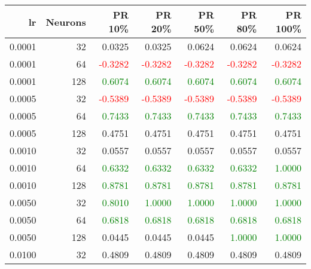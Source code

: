 \begin{tabular}{rrrrrrr}
\toprule
lr & Neurons & PR 10\% & PR 20\% & PR 50\% & PR 80\% & PR 100\% \\
\midrule
0.0001 & 32 & \textcolor{blu} {0.0325} & \textcolor{blu} {0.0325} & \textcolor{blu} {0.0624} & \textcolor{blu} {0.0624} & \textcolor{blu} {0.0624} \\
0.0001 & 64 & \textcolor{red} {-0.3282} & \textcolor{red} {-0.3282} & \textcolor{red} {-0.3282} & \textcolor{red} {-0.3282} & \textcolor{red} {-0.3282} \\
0.0001 & 128 & \textcolor{green} {0.6074} & \textcolor{green} {0.6074} & \textcolor{green} {0.6074} & \textcolor{green} {0.6074} & \textcolor{green} {0.6074} \\
0.0005 & 32 & \textcolor{red} {-0.5389} & \textcolor{red} {-0.5389} & \textcolor{red} {-0.5389} & \textcolor{red} {-0.5389} & \textcolor{red} {-0.5389} \\
0.0005 & 64 & \textcolor{green} {0.7433} & \textcolor{green} {0.7433} & \textcolor{green} {0.7433} & \textcolor{green} {0.7433} & \textcolor{green} {0.7433} \\
0.0005 & 128 & \textcolor{blu} {0.4751} & \textcolor{blu} {0.4751} & \textcolor{blu} {0.4751} & \textcolor{blu} {0.4751} & \textcolor{blu} {0.4751} \\
0.0010 & 32 & \textcolor{blu} {0.0557} & \textcolor{blu} {0.0557} & \textcolor{blu} {0.0557} & \textcolor{blu} {0.0557} & \textcolor{blu} {0.0557} \\
0.0010 & 64 & \textcolor{green} {0.6332} & \textcolor{green} {0.6332} & \textcolor{green} {0.6332} & \textcolor{green} {0.6332} & \textcolor{green} {1.0000} \\
0.0010 & 128 & \textcolor{green} {0.8781} & \textcolor{green} {0.8781} & \textcolor{green} {0.8781} & \textcolor{green} {0.8781} & \textcolor{green} {0.8781} \\
0.0050 & 32 & \textcolor{green} {0.8010} & \textcolor{green} {1.0000} & \textcolor{green} {1.0000} & \textcolor{green} {1.0000} & \textcolor{green} {1.0000} \\
0.0050 & 64 & \textcolor{green} {0.6818} & \textcolor{green} {0.6818} & \textcolor{green} {0.6818} & \textcolor{green} {0.6818} & \textcolor{green} {0.6818} \\
0.0050 & 128 & \textcolor{blu} {0.0445} & \textcolor{blu} {0.0445} & \textcolor{blu} {0.0445} & \textcolor{green} {1.0000} & \textcolor{green} {1.0000} \\
0.0100 & 32 & \textcolor{blu} {0.4809} & \textcolor{blu} {0.4809} & \textcolor{blu} {0.4809} & \textcolor{blu} {0.4809} & \textcolor{blu} {0.4809} \\

\end{tabular}
